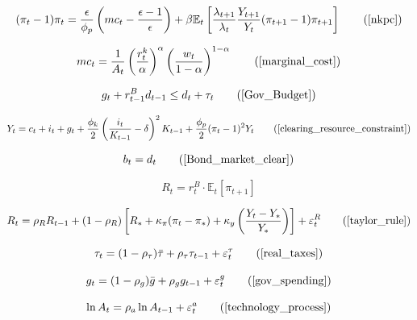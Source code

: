 \documentclass[11pt,preprint]{elsarticle}
\numberwithin{equation}{section}
\numberwithin{figure}{section}
\numberwithin{table}{section}
\begin{document}
\begin{equation}
(\pi_t - 1)\pi_t = \frac{\epsilon}{\phi_p} \left( mc_t - \frac{\epsilon-1}{\epsilon} \right) + \beta \mathbb{E}_t \left[ \frac{\lambda_{t+1}}{\lambda_t} \frac{Y_{t+1}}{Y_t} (\pi_{t+1} - 1)\pi_{t+1} \right]  \tag{\ref{nkpc}}
\end{equation}

\begin{equation}
mc_t = \frac{1}{A_t} \left( \frac{r_t^k}{\alpha} \right)^{\alpha} \left( \frac{w_t}{1-\alpha} \right)^{1-\alpha}  \tag{\ref{marginal_cost}}
\end{equation}

\begin{equation}
g_t + r^B_{t-1} d_{t-1} \leq d_t + \tau_t \tag{\ref{Gov_Budget}}
\end{equation}

\begin{equation}
   Y_t = c_t + i_t + g_t + \frac{\phi_k}{2} \left( \frac{i_t}{K_{t-1}} - \delta \right)^2 K_{t-1} + \frac{\phi_p}{2} (\pi_t - 1)^2 Y_t
   \tag{\ref{clearing_resource_constraint}}
\end{equation}

\begin{equation}
b_t = d_t
\tag{\ref{Bond_market_clear}}
\end{equation}

\begin{equation}
R_t = r^B_t \cdot \mathbb{E}_t[\pi_{t+1}]  
\end{equation}

\begin{equation}
R_t = \rho_R R_{t-1} + (1 - \rho_R) \left[ R_* + \kappa_\pi (\pi_t - \pi_*) + \kappa_y \left( \frac{Y_t - Y_*}{Y_*} \right) \right] + \varepsilon_t^R
\tag{\ref{taylor_rule}}
\end{equation}

\begin{equation}
\tau_t = (1-\rho_\tau)\bar{\tau} + \rho_\tau \tau_{t-1} + \varepsilon_t^\tau 
\tag{\ref{real_taxes}}
\end{equation}

\begin{equation}
g_t = (1-\rho_g)\bar{g} + \rho_g g_{t-1} + \varepsilon_t^g 
\tag{\ref{gov_spending}}
\end{equation}

\begin{equation}
\ln A_t = \rho_a \ln A_{t-1} + \varepsilon_t^a 
\tag{\ref{technology_process}}
\end{equation}
\end{document}
